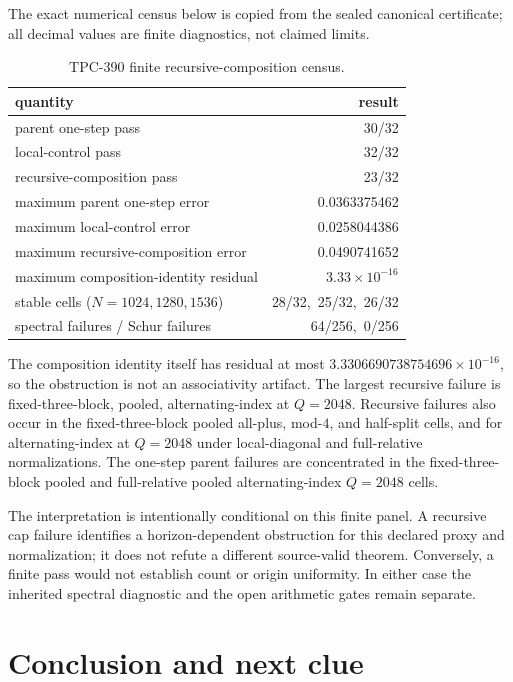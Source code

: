 \documentclass[10pt]{article}
\begin{document}
The exact numerical census below is copied from the sealed canonical
certificate; all decimal values are finite diagnostics, not claimed limits.

\begin{table}[t]
\centering
\caption{TPC-390 finite recursive-composition census.}
\small
\begin{tabular}{@{}l r@{}}
\toprule
quantity & result\\
\midrule
parent one-step pass & 30/32\\
local-control pass & 32/32\\
recursive-composition pass & 23/32\\
maximum parent one-step error & 0.0363375462\\
maximum local-control error & 0.0258044386\\
maximum recursive-composition error & 0.0490741652\\
maximum composition-identity residual & $3.33\times10^{-16}$\\
stable cells ($N=1024,1280,1536$) & 28/32,\ 25/32,\ 26/32\\
spectral failures / Schur failures & 64/256,\ 0/256\\
\bottomrule
\end{tabular}
\end{table}

The composition identity itself has residual at most
$3.3306690738754696\times 10^{-16}$, so the obstruction is not an
associativity artifact.  The largest recursive failure is fixed-three-block,
pooled, alternating-index at $Q=2048$.  Recursive failures also occur in the
fixed-three-block pooled all-plus, mod-$4$, and half-split cells, and for
alternating-index at $Q=2048$ under local-diagonal and full-relative
normalizations.  The one-step parent failures are concentrated in the
fixed-three-block pooled and full-relative pooled alternating-index
$Q=2048$ cells.

The interpretation is intentionally conditional on this finite panel.  A
recursive cap failure identifies a horizon-dependent obstruction for this
declared proxy and normalization; it does not refute a different source-valid
theorem.  Conversely, a finite pass would not establish count or origin
uniformity.  In either case the inherited spectral diagnostic and the open
arithmetic gates remain separate.

\section{Conclusion and next clue}
\end{document}
